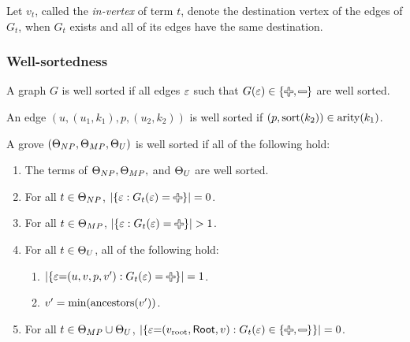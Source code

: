 Let $v_t$, called the \emph{in-vertex} of term $t$,
denote the destination vertex of the edges of $G_t$,
when $G_t$ exists and all of its edges have the same destination.


\subsubsection{Well-sortedness}

\begin{definition}
  A graph $G$ is well sorted if all edges $\e$ such that $G(\e) \in \{\Plus, \Minus\}$ are well sorted.
\end{definition}

\begin{definition}
  An edge $(u, (u_1, k_1), p, (u_2, k_2))$ is well sorted if $(p, \sort{k_2}) \in \arity{k_1}$.
\end{definition}

\begin{definition}
  A grove $(\Set[NP], \Set[MP], \Set[U])$ is well sorted if all of the following hold:
  \begin{enumerate}
    \item The terms of $\Set[NP], \Set[MP],$ and $\Set[U]$ are well sorted.
    \item For all $t \in \Set[NP]$,
      $\SizeOf{\SetOf{\e \SuchThat{G_t(\e) = \Plus}}} = 0$.
    \item For all $t \in \Set[MP]$,
      $\SizeOf{\SetOf{\e \SuchThat{G_t(\e) = \Plus}}} > 1$.
    \item For all $t \in \Set[U]$, all of the following hold:
      \begin{enumerate}
        \item $\SizeOf{\SetOf{\e{=}(u, v, p, v') \SuchThat{G_t(\e) = \Plus}}} = 1$.
        \item $v' = \min{\ancestors{v'}}$.
      \end{enumerate}
    \item For all $t \in \Set[MP] \cup \Set[U]$,
      $\SizeOf{\SetOf{\e{=}(\rootVertex, \Root, v) \SuchThat{G_t(\e) \in \SetOf{\Plus, \Minus}}}} = 0$.
  \end{enumerate}
\end{definition}

